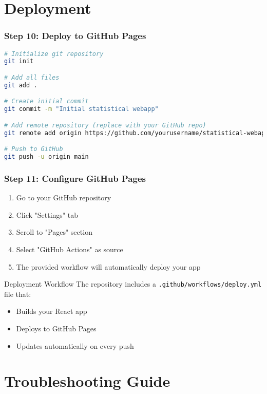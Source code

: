 \documentclass[aspectratio=169]{beamer}
\begin{document}
\section{Deployment}

\begin{frame}[fragile]
\frametitle{Step 10: Deploy to GitHub Pages}
\begin{lstlisting}[language=bash, caption=Initialize Git Repository]
# Initialize git repository
git init

# Add all files
git add .

# Create initial commit
git commit -m "Initial statistical webapp"

# Add remote repository (replace with your GitHub repo)
git remote add origin https://github.com/yourusername/statistical-webapp.git

# Push to GitHub
git push -u origin main
\end{lstlisting}
\end{frame}

\begin{frame}[fragile]
\frametitle{Step 11: Configure GitHub Pages}
\begin{enumerate}
\item Go to your GitHub repository
\item Click "Settings" tab
\item Scroll to "Pages" section
\item Select "GitHub Actions" as source
\item The provided workflow will automatically deploy your app
\end{enumerate}

\begin{alertblock}{Deployment Workflow}
The repository includes a \texttt{.github/workflows/deploy.yml} file that:
\begin{itemize}
\item Builds your React app
\item Deploys to GitHub Pages
\item Updates automatically on every push
\end{itemize}
\end{alertblock}
\end{frame}

\section{Troubleshooting Guide}
\end{document}
